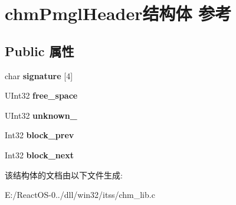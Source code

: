 \hypertarget{structchm_pmgl_header}{}\section{chm\+Pmgl\+Header结构体 参考}
\label{structchm_pmgl_header}
\subsection*{Public 属性}
\begin{DoxyCompactItemize}
\item 
\mbox{\label{structchm_pmgl_header_ad68ca16e5fc8350d60729e851ea31a59}} 
char {\bfseries signature} \mbox{[}4\mbox{]}
\item 
\mbox{\label{structchm_pmgl_header_a776394cc21bba7cb8ab6f7b0b17013e1}} 
U\+Int32 {\bfseries free\+\_\+space}
\item 
\mbox{\label{structchm_pmgl_header_ab5870af54020d9ed46a1baef5af57244}} 
U\+Int32 {\bfseries unknown\+\_}
\item 
\mbox{\label{structchm_pmgl_header_a71d55fec6d7dd9d005b7c56f9304c4e8}} 
Int32 {\bfseries block\+\_\+prev}
\item 
\mbox{\label{structchm_pmgl_header_a7a16f47e67dc2e552486acceb9f9d477}} 
Int32 {\bfseries block\+\_\+next}
\end{DoxyCompactItemize}


该结构体的文档由以下文件生成\+:\begin{DoxyCompactItemize}
\item 
E\+:/\+React\+O\+S-\/0../dll/win32/itss/chm\+\_\+lib.\+c\end{DoxyCompactItemize}
